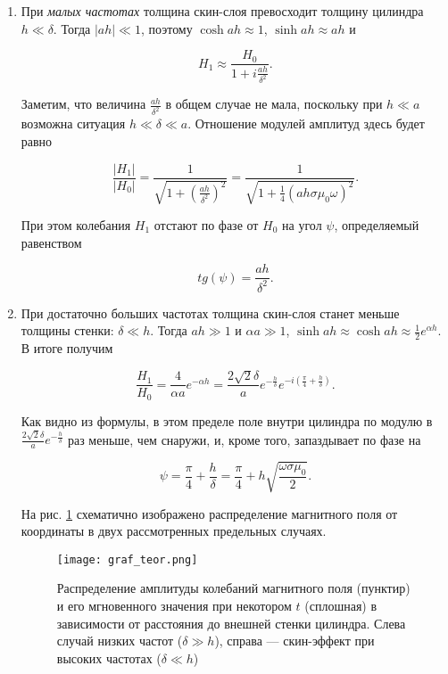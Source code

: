 \documentclass[a4paper,12pt]{article} %
\begin{document}
\begin{enumerate}
    \item При \textit{малых частотах} толщина скин-слоя превосходит толщину цилиндра $h \ll \delta$. Тогда $|ah|\ll 1$, поэтому $\cosh{ah} \approx 1$, $\sinh{ah} \approx ah$ и

    \[ H_1 \approx \frac{H_0}{1 + i\frac{ah}{\delta^2}}. \]
    
    Заметим, что величина $\frac{ah}{\delta^2}$ в общем случае не мала, поскольку при $h \ll a$ возможна ситуация $h \ll \delta \ll a$. Отношение модулей амплитуд здесь будет равно
    
    \[ \frac{|H_1|}{|H_0|} = \frac{1}{\sqrt{1 + (\frac{ah}{\delta^2})^2}} = \frac{1}{\sqrt{1+\frac{1}{4}(a h \sigma \mu_0 \omega)^2}}. \]
    
    При этом колебания $H_1$ отстают по фазе от $H_0$ на угол $\psi$, определяемый равенством
    
    \[ tg(\psi) = \frac{ah}{\delta^2}. \]

    \item При достаточно больших частотах толщина скин-слоя станет меньше толщины стенки: $\delta \ll h$. Тогда $ah \gg 1$ и $\alpha a \gg 1$, $\sinh{ah} \approx \cosh{ah} \approx \frac{1}{2} e^{\alpha h}$. В итоге получим

    \[ \frac{H_1}{H_0} = \frac{4}{\alpha a} e^{-\alpha h} = \frac{2\sqrt{2} \delta}{a} e^{-\frac{h}{\delta}}e^{-i(\frac{\pi}{4} + \frac{h}{\delta})}. \]

    Как видно из формулы, в этом пределе поле внутри цилиндра по модулю в $\frac{2\sqrt{2} \delta}{a} e^{-\frac{h}{\delta}}$ раз меньше, чем снаружи, и, кроме того, запаздывает по фазе на

    \[ \psi = \frac{\pi}{4} + \frac{h}{\delta} = \frac{\pi}{4} + h \sqrt{\frac{\omega \sigma \mu_0}{2}}. \]

    На рис. \ref{img3} схематично изображено распределение магнитного поля от координаты в двух рассмотренных предельных случаях.

    \begin{figure}[h]
        \begin{center}
    		\texttt{[image: graf\_teor.png]}
        \end{center}
    	\caption{Распределение амплитуды колебаний магнитного поля (пунктир) и его мгновенного значения при некотором $t$ (сплошная) в зависимости от расстояния до внешней стенки цилиндра.
Слева случай низких частот ($\delta \gg h$), справа — скин-эффект при высоких частотах ($\delta \ll h$)}
    \label{img3}
    \end{figure}

\end{enumerate}
\end{document}
